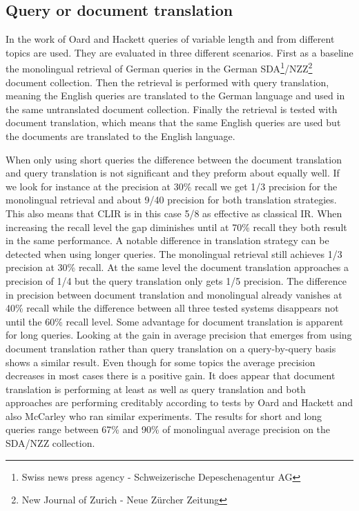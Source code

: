\documentclass[journal]{IEEEtran}
\begin{document}
\subsection{Query or document translation}
In the work of Oard and Hackett \cite{oard97b} queries of variable length and from different topics are used.
They are evaluated in three different scenarios.
First as a baseline the monolingual retrieval of German queries in the German SDA\footnote{Swiss news press agency - Schweizerische Depeschenagentur AG}/NZZ\footnote{New Journal of Zurich - Neue Z\"{u}rcher Zeitung} document collection.
Then the retrieval is performed with query translation, meaning the English queries are translated to the German language and used in the same untranslated document collection.
Finally the retrieval is tested with document translation, which means that the same English queries are used but the documents are translated to the English language.

When only using short queries the difference between the document translation and query translation is not significant and they preform about equally well.
If we look for instance at the precision at 30\% recall we get 1/3 precision for the monolingual retrieval and about 9/40 precision for both translation strategies.
This also means that CLIR is in this case 5/8 as effective as classical IR.
When increasing the recall level the gap diminishes until at 70\% recall they both result in the same performance.
A notable difference in translation strategy can be detected when using longer queries.
The monolingual retrieval still achieves 1/3 precision at 30\% recall.
At the same level the document translation approaches a precision of 1/4 but the query translation only gets 1/5 precision.
The difference in precision between document translation and monolingual already vanishes at 40\% recall while the difference between all three tested systems disappears not until the 60\% recall level.
Some advantage for document translation is apparent for long queries.
Looking at the gain in average precision that emerges from using document translation rather than query translation on a query-by-query basis shows a similar result.
Even though for some topics the average precision decreases in most cases there is a positive gain.
It does appear that document translation is performing at least as well as query translation and both approaches are performing creditably according to tests by Oard and Hackett \cite{oard97b} and also McCarley \cite{mccarley99} who ran similar experiments.
The results for short and long queries range between 67\% and 90\% of monolingual average precision on the SDA/NZZ collection.
\end{document}
